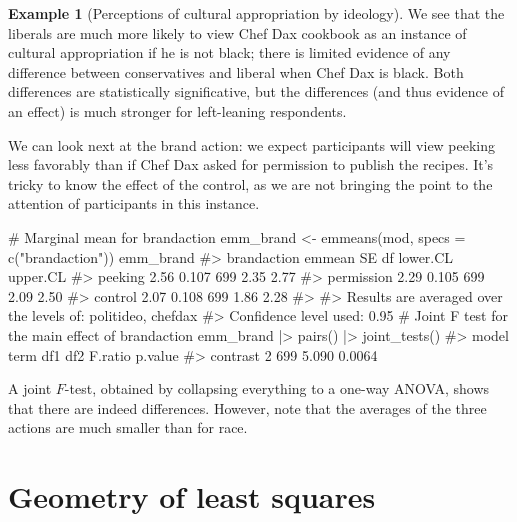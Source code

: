 \documentclass[
  11pt,
  letterpaper,
]{scrbook}
\newenvironment{Shaded}{\begin{snugshade}}{\end{snugshade}}
\newcommand{\AttributeTok}[1]{\textcolor[rgb]{0.40,0.45,0.13}{#1}}
\newcommand{\CommentTok}[1]{\textcolor[rgb]{0.37,0.37,0.37}{#1}}
\newcommand{\FunctionTok}[1]{\textcolor[rgb]{0.28,0.35,0.67}{#1}}
\newcommand{\NormalTok}[1]{\textcolor[rgb]{0.00,0.23,0.31}{#1}}
\newcommand{\OtherTok}[1]{\textcolor[rgb]{0.00,0.23,0.31}{#1}}
\newcommand{\SpecialCharTok}[1]{\textcolor[rgb]{0.37,0.37,0.37}{#1}}
\newcommand{\StringTok}[1]{\textcolor[rgb]{0.13,0.47,0.30}{#1}}
\theoremstyle{definition}
\theoremstyle{definition}
\newtheorem{example}{Example}[chapter]
\theoremstyle{plain}
\theoremstyle{plain}
\theoremstyle{remark}
\begin{document}
\begin{example}[Perceptions of cultural appropriation by
ideology]
We see that the liberals are much more likely to view Chef Dax cookbook
as an instance of cultural appropriation if he is not black; there is
limited evidence of any difference between conservatives and liberal
when Chef Dax is black. Both differences are statistically
significative, but the differences (and thus evidence of an effect) is
much stronger for left-leaning respondents.

We can look next at the brand action: we expect participants will view
peeking less favorably than if Chef Dax asked for permission to publish
the recipes. It's tricky to know the effect of the control, as we are
not bringing the point to the attention of participants in this
instance.

\begin{Shaded}
\begin{Highlighting}[]
\CommentTok{\# Marginal mean for brandaction}
\NormalTok{emm\_brand }\OtherTok{\textless{}{-}} \FunctionTok{emmeans}\NormalTok{(mod, }\AttributeTok{specs =} \FunctionTok{c}\NormalTok{(}\StringTok{"brandaction"}\NormalTok{)) }
\NormalTok{emm\_brand}
\CommentTok{\#\textgreater{}  brandaction emmean    SE  df lower.CL upper.CL}
\CommentTok{\#\textgreater{}  peeking       2.56 0.107 699     2.35     2.77}
\CommentTok{\#\textgreater{}  permission    2.29 0.105 699     2.09     2.50}
\CommentTok{\#\textgreater{}  control       2.07 0.108 699     1.86     2.28}
\CommentTok{\#\textgreater{} }
\CommentTok{\#\textgreater{} Results are averaged over the levels of: politideo, chefdax }
\CommentTok{\#\textgreater{} Confidence level used: 0.95}
\CommentTok{\# Joint F test for the main effect of brandaction}
\NormalTok{emm\_brand }\SpecialCharTok{|\textgreater{}} \FunctionTok{pairs}\NormalTok{() }\SpecialCharTok{|\textgreater{}} \FunctionTok{joint\_tests}\NormalTok{()}
\CommentTok{\#\textgreater{}  model term df1 df2 F.ratio p.value}
\CommentTok{\#\textgreater{}  contrast     2 699   5.090  0.0064}
\end{Highlighting}
\end{Shaded}

A joint \(F\)-test, obtained by collapsing everything to a one-way
ANOVA, shows that there are indeed differences. However, note that the
averages of the three actions are much smaller than for race.

\end{example}

\section{Geometry of least squares}\label{geometry-of-least-squares}
\end{document}
